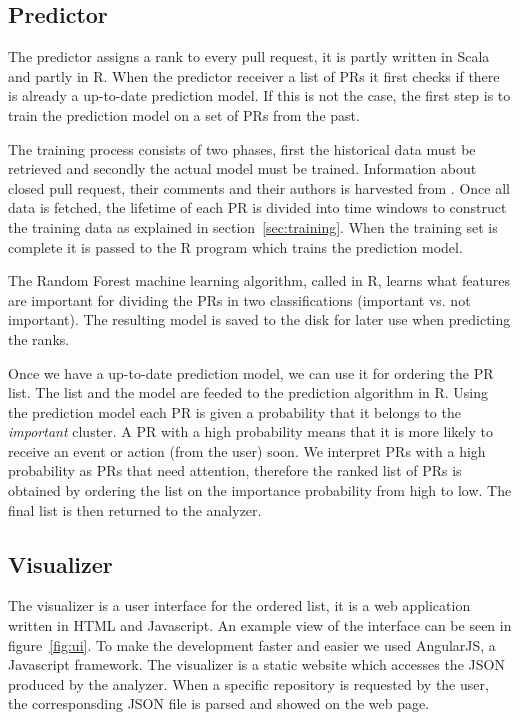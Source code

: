 \documentclass[conference]{IEEEtran}
\begin{document}
\subsection{Predictor}
\label{sec:predictor}
The predictor assigns a rank to every pull request, it is partly written in Scala and partly in R.
When the predictor receiver a list of PRs it first checks if there is already a up-to-date prediction model.
If this is not the case, the first step is to train the prediction model on a set of PRs from the past.

The training process consists of two phases, first the historical data must be retrieved and secondly the actual model must be trained.
Information about closed pull request, their comments and their authors is harvested from \ghtorrent.
Once all data is fetched, the lifetime of each PR is divided into time windows to construct the training data as explained in section~\ref{sec:training}.
When the training set is complete it is passed to the R program which trains the prediction model.

The Random Forest machine learning algorithm, called in R, learns what features are important for dividing the PRs in two classifications (important vs. not important).
The resulting model is saved to the disk for later use when predicting the ranks.

Once we have a up-to-date prediction model, we can use it for ordering the PR list.
The list and the model are feeded to the prediction algorithm in R.
Using the prediction model each PR is given a probability that it belongs to the \emph{important} cluster.
A PR with a high probability means that it is more likely to receive an event or action (from the user) soon.
We interpret PRs with a high probability as PRs that need attention, therefore the ranked list of PRs is obtained by ordering the list on the importance probability from high to low.
The final list is then returned to the analyzer.

\subsection{Visualizer}
\label{sec:visualizer}
The visualizer is a user interface for the ordered list, it is a web application written in HTML and Javascript.
An example view of the interface can be seen in figure~\ref{fig:ui}.
To make the development faster and easier we used AngularJS, a Javascript framework.
The visualizer is a static website which accesses the JSON produced by the analyzer.
When a specific repository is requested by the user, the corresponsding JSON file is parsed and showed on the web page.
\end{document}
